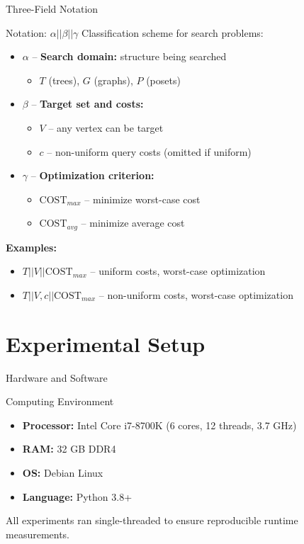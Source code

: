 \documentclass[aspectratio=169]{beamer}
\newcommand{\COST}{\text{COST}}
\begin{document}
\begin{frame}{Three-Field Notation}
\begin{block}{Notation: $\alpha||\beta||\gamma$}
Classification scheme for search problems:
\begin{itemize}
    \item $\alpha$ -- \textbf{Search domain:} structure being searched
    \begin{itemize}
        \item $T$ (trees), $G$ (graphs), $P$ (posets)
    \end{itemize}
    \item $\beta$ -- \textbf{Target set and costs:}
    \begin{itemize}
        \item $V$ -- any vertex can be target
        \item $c$ -- non-uniform query costs (omitted if uniform)
    \end{itemize}
    \item $\gamma$ -- \textbf{Optimization criterion:}
    \begin{itemize}
        \item $\COST_{max}$ -- minimize worst-case cost
        \item $\COST_{avg}$ -- minimize average cost
    \end{itemize}
\end{itemize}
\end{block}

\vspace{0.3cm}
\textbf{Examples:}
\begin{itemize}
    \item $T||V||\COST_{max}$ -- uniform costs, worst-case optimization
    \item $T||V, c||\COST_{max}$ -- non-uniform costs, worst-case optimization
\end{itemize}
\end{frame}

\section{Experimental Setup}

\begin{frame}{Hardware and Software}
\begin{block}{Computing Environment}
\begin{itemize}
    \item \textbf{Processor:} Intel Core i7-8700K (6 cores, 12 threads, 3.7 GHz)
    \item \textbf{RAM:} 32 GB DDR4
    \item \textbf{OS:} Debian Linux
    \item \textbf{Language:} Python 3.8+
\end{itemize}
\end{block}

\vspace{0.3cm}
All experiments ran single-threaded to ensure reproducible runtime measurements.
\end{frame}
\end{document}
